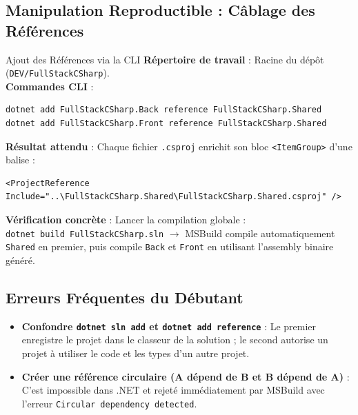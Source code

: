 \documentclass[a4paper,11pt]{report}
\begin{document}
\newpage

\subsection*{Manipulation Reproductible : Câblage des Références}

\begin{bestpracticebox}{Ajout des Références via la CLI}
\textbf{Répertoire de travail} : Racine du dépôt (\texttt{DEV/FullStackCSharp}).\\[2pt]
\textbf{Commandes CLI} :
\begin{verbatim}
dotnet add FullStackCSharp.Back reference FullStackCSharp.Shared
dotnet add FullStackCSharp.Front reference FullStackCSharp.Shared
\end{verbatim}
\textbf{Résultat attendu} : Chaque fichier \texttt{.csproj} enrichit son bloc \texttt{<ItemGroup>} d'une balise :
\begin{verbatim}
<ProjectReference Include="..\FullStackCSharp.Shared\FullStackCSharp.Shared.csproj" />
\end{verbatim}
\textbf{Vérification concrète} : Lancer la compilation globale :\\
\texttt{dotnet build FullStackCSharp.sln} $\longrightarrow$ MSBuild compile automatiquement \texttt{Shared} en premier, puis compile \texttt{Back} et \texttt{Front} en utilisant l'assembly binaire généré.
\end{bestpracticebox}

\vspace{0.2cm}

\subsection*{Erreurs Fréquentes du Débutant}

\begin{itemize}
    \item \textbf{Confondre \texttt{dotnet sln add} et \texttt{dotnet add reference}} : Le premier enregistre le projet dans le classeur de la solution ; le second autorise un projet à utiliser le code et les types d'un autre projet.
    \item \textbf{Créer une référence circulaire (A dépend de B et B dépend de A)} : C'est impossible dans .NET et rejeté immédiatement par MSBuild avec l'erreur \texttt{Circular dependency detected}.
\end{itemize}

\vspace{0.2cm}
\end{document}
